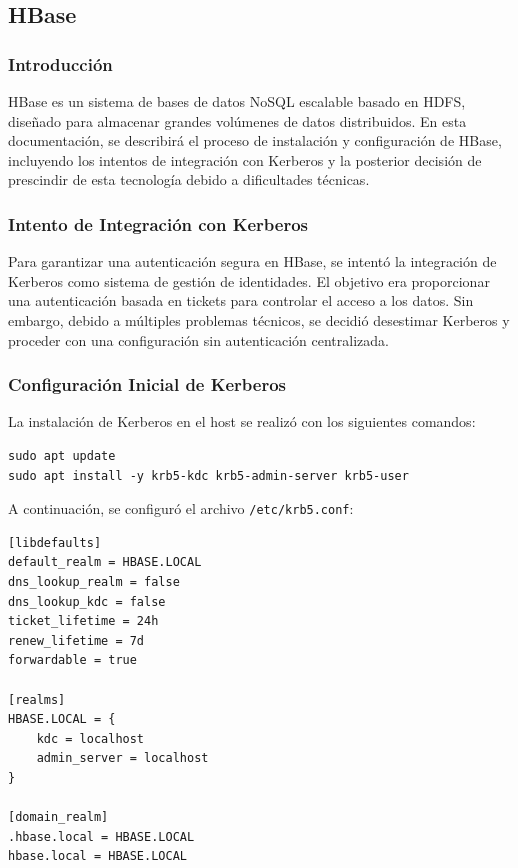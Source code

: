 \documentclass{article}
\begin{document}
\newpage
\subsection{HBase}
\subsubsection{Introducción}
HBase es un sistema de bases de datos NoSQL escalable basado en HDFS, diseñado para almacenar grandes volúmenes de datos distribuidos. En esta documentación, se describirá el proceso de instalación y configuración de HBase, incluyendo los intentos de integración con Kerberos y la posterior decisión de prescindir de esta tecnología debido a dificultades técnicas.

\subsubsection{Intento de Integración con Kerberos}
Para garantizar una autenticación segura en HBase, se intentó la integración de Kerberos como sistema de gestión de identidades. El objetivo era proporcionar una autenticación basada en tickets para controlar el acceso a los datos. Sin embargo, debido a múltiples problemas técnicos, se decidió desestimar Kerberos y proceder con una configuración sin autenticación centralizada.


\subsubsection{Configuración Inicial de Kerberos}

La instalación de Kerberos en el host se realizó con los siguientes comandos:

\begin{lstlisting}[style=bashStyle]
sudo apt update
sudo apt install -y krb5-kdc krb5-admin-server krb5-user
\end{lstlisting}

A continuación, se configuró el archivo \texttt{/etc/krb5.conf}:

\begin{verbatim}
[libdefaults]
default_realm = HBASE.LOCAL
dns_lookup_realm = false
dns_lookup_kdc = false
ticket_lifetime = 24h
renew_lifetime = 7d
forwardable = true

[realms]
HBASE.LOCAL = {
    kdc = localhost
    admin_server = localhost
}

[domain_realm]
.hbase.local = HBASE.LOCAL
hbase.local = HBASE.LOCAL
\end{verbatim}
\end{document}

